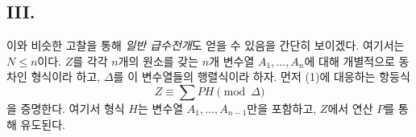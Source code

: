 
\subsection*{III.}
이와 비슷한 고찰을 통해 \emph{일반 급수전개}도 얻을 수 있음을 간단히 보이겠다. 여기서는 $N\le n$이다. $Z$를 각각 $n$개의 원소를 갖는 $n$개 변수열 $A_1,\ldots,A_n$에 대해 개별적으로 동차인 형식이라 하고, $\Delta$를 이 변수열들의 행렬식이라 하자. 먼저 (1)에 대응하는 항등식
\begin{equation}
  Z\equiv\sum PH \pmod{\Delta}
\tag{2}
\end{equation}
을 증명한다. 여기서 형식 $H$는 변수열 $A_1,\ldots,A_{n-1}$만을 포함하고, $Z$에서 연산 $P$를 통해 유도된다.
